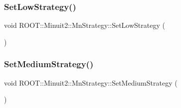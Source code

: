 \subsubsection{\texorpdfstring{SetLowStrategy()}{SetLowStrategy()}\hspace{0.1cm}{\footnotesize\ttfamily [3/3]}}
{\footnotesize\ttfamily void R\+O\+O\+T\+::\+Minuit2\+::\+Mn\+Strategy\+::\+Set\+Low\+Strategy (\begin{DoxyParamCaption}{ }\end{DoxyParamCaption})}

\mbox{\label{classROOT_1_1Minuit2_1_1MnStrategy_ae813d1aedcf6fa8f2bfb09a501a783f4}} 
\subsubsection{\texorpdfstring{SetMediumStrategy()}{SetMediumStrategy()}\hspace{0.1cm}{\footnotesize\ttfamily [1/3]}}
{\footnotesize\ttfamily void R\+O\+O\+T\+::\+Minuit2\+::\+Mn\+Strategy\+::\+Set\+Medium\+Strategy (\begin{DoxyParamCaption}{ }\end{DoxyParamCaption})}

